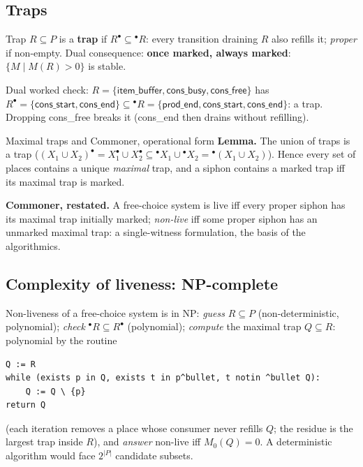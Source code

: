 \subsection{Traps}

\begin{definitionbox}{Trap}
$R \subseteq P$ is a \textbf{trap} if $R^\bullet \subseteq {}^\bullet R$: every transition draining $R$ also refills it; \emph{proper} if non-empty. Dual consequence: \textbf{once marked, always marked}: $\{M \mid M(R) > 0\}$ is stable.
\end{definitionbox}

Dual worked check: $R = \{\textsf{item\_buffer}, \textsf{cons\_busy}, \textsf{cons\_free}\}$ has $R^\bullet = \{\textsf{cons\_start}, \textsf{cons\_end}\} \subseteq {}^\bullet R = \{\textsf{prod\_end}, \textsf{cons\_start}, \textsf{cons\_end}\}$: a trap. Dropping \textsf{cons\_free} breaks it (\textsf{cons\_end} then drains without refilling).

\begin{notebox}{Maximal traps and Commoner, operational form}
\textbf{Lemma.} The union of traps is a trap ($(X_1 \cup X_2)^\bullet = X_1^\bullet \cup X_2^\bullet \subseteq {}^\bullet X_1 \cup {}^\bullet X_2 = {}^\bullet(X_1 \cup X_2)$). Hence every set of places contains a unique \emph{maximal} trap, and a siphon contains a marked trap iff its maximal trap is marked.
\par\smallskip
\textbf{Commoner, restated.} A free-choice system is live iff every proper siphon has its maximal trap initially marked; \emph{non-live} iff some proper siphon has an unmarked maximal trap: a single-witness formulation, the basis of the algorithmics.
\end{notebox}

\subsection{Complexity of liveness: NP-complete}

Non-liveness of a free-choice system is in \textsf{NP}: \emph{guess} $R \subseteq P$ (non-deterministic, polynomial); \emph{check} ${}^\bullet R \subseteq R^\bullet$ (polynomial); \emph{compute} the maximal trap $Q \subseteq R$: polynomial by the routine
\begin{lstlisting}
Q := R
while (exists p in Q, exists t in p^bullet, t notin ^bullet Q):
    Q := Q \ {p}
return Q
\end{lstlisting}
(each iteration removes a place whose consumer never refills $Q$; the residue is the largest trap inside $R$), and \emph{answer} non-live iff $M_0(Q) = 0$. A deterministic algorithm would face $2^{|P|}$ candidate subsets.

